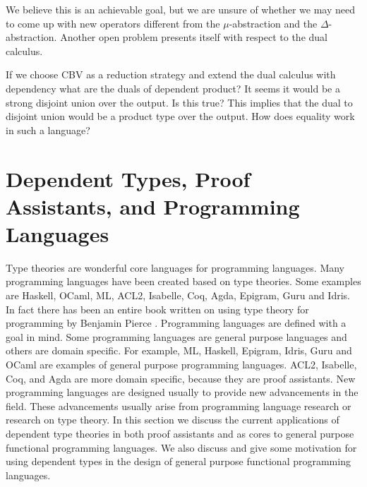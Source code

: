 \noindent
We believe this is an achievable goal, but we are unsure of whether we
may need to come up with new operators different from the
$\mu$-abstraction and the $\Delta$-abstraction.  Another open
problem presents itself with respect to the dual calculus.
\begin{openproblem}
  If we choose CBV as a reduction strategy and extend the dual
  calculus with dependency what are the duals of dependent product?
  It seems it would be a strong disjoint union over the output.  Is
  this true?  This implies that the dual to disjoint union would be a
  product type over the output. How does equality work in such a
  language?
\end{openproblem}

\section{Dependent Types, Proof Assistants, and Programming Languages}
\label{sec:the_design_of_programming_languages}
Type theories are wonderful core languages for programming languages.
Many programming languages have been created based on type
theories. Some examples are Haskell, OCaml, ML, ACL2, Isabelle, Coq,
Agda, Epigram, Guru and Idris.  In fact there has been an entire book
written on using type theory for programming by Benjamin Pierce
\cite{Pierce:2002}.  Programming languages are defined with a goal in
mind.  Some programming languages are general purpose languages and
others are domain specific.  For example, ML, Haskell, Epigram, Idris,
Guru and OCaml are examples of general purpose programming
languages. ACL2, Isabelle, Coq, and Agda are more domain
specific, because they are proof assistants. New programming languages
are designed usually to provide new advancements in the field.  These
advancements usually arise from programming language research or
research on type theory.  In this section we discuss the current
applications of dependent type theories in both proof assistants and
as cores to general purpose functional programming languages.  We also
discuss and give some motivation for using dependent types in the
design of general purpose functional programming languages.

